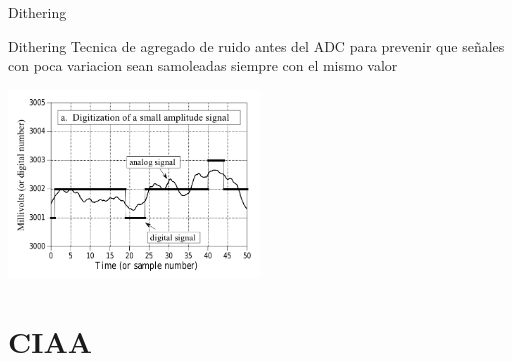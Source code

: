  \begin{frame}{Dithering}{}
    \begin{block}{Dithering}
       Tecnica de agregado de ruido antes del ADC para prevenir que señales con poca variacion sean samoleadas siempre con el mismo valor
    \end{block}
       \center\includegraphics[width=0.5\textwidth]{1_clase/dither}
    \vfill
 \end{frame}
 \section{CIAA}
